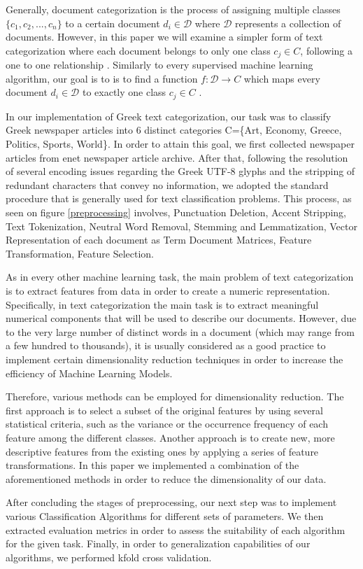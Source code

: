 \documentclass[10pt,journal,compsoc]{IEEEtran}
\begin{document}
\par
Generally, document categorization is the process of assigning
multiple classes $\{c_1,c_2,...,c_n\}$ to a certain document
$d_i\in \mathcal{D}$ where $\mathcal{D}$ represents a 
collection of documents.
However, in this paper we will examine a simpler form 
of text categorization where each document belongs to only 
one class $c_j\in C$, 
following a one to one relationship \cite{a1}.
Similarly to every supervised machine learning algorithm,
our goal is to is to find a function $f: \mathcal{D}\rightarrow C$
which maps every document $d_i\in \mathcal{D}$ to exactly one
class $c_j \in C$ .
\par
In our implementation of Greek text categorization, our task
was to classify Greek newspaper articles into 6 distinct 
categories C=\{Art, Economy, Greece, Politics, Sports, World\}.
In order to attain this goal, we first collected newspaper articles
from enet newspaper article archive.
After that, following the resolution of several encoding issues 
regarding the Greek UTF-8 glyphs and the stripping of redundant
characters that convey no information, we adopted
the standard procedure that is generally used for text classification
problems.
This process, as seen on figure \ref{preprocessing} involves, 
Punctuation Deletion, Accent Stripping, Text Tokenization, 
Neutral Word Removal, Stemming and Lemmatization, 
Vector Representation of each document as Term Document Matrices, 
Feature Transformation, Feature Selection.
\par
As in every other machine learning task, the main problem of text
categorization is to extract features from data in order to create
a numeric representation.
Specifically, in text categorization the main task is to extract
meaningful numerical components that will be used to describe
our documents.
However, due to the very large number of distinct words in a
document (which may range from a few hundred to thousands), 
it is usually considered as a good practice to
implement certain dimensionality reduction techniques in
order to increase the efficiency of Machine Learning Models.
\par
Therefore, various methods can be employed for dimensionality 
reduction.
The first approach is to select a subset of the original features
by using several statistical criteria, such as the variance
or the occurrence frequency of each feature among the 
different classes.
Another approach is to create new, more descriptive features
from the existing ones by applying a series of feature 
transformations.
In this paper we implemented a combination of the aforementioned
methods in order to reduce the dimensionality of our data.
\par
After concluding the stages of preprocessing, our next step
was to implement various Classification Algorithms for different
sets of parameters.
We then extracted evaluation metrics in order to assess the
suitability of each algorithm for the given task.
Finally, in order to generalization capabilities of our algorithms,
we performed kfold cross validation.
\end{document}
